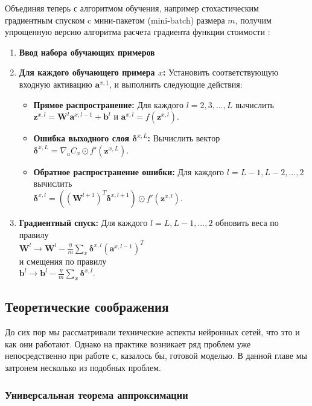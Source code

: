 Объединяя теперь с алгоритмом обучения, например стохастическим градиентным 
спуском c мини-пакетом (mini-batch) размера $m$, получим упрощенную версию 
алгоритма расчета градиента функции стоимости \cite{NN_Nielsen}:
\begin{enumerate}
    \item \textbf{Ввод набора обучающих примеров}
    \item \textbf{Для каждого обучающего примера $x$:} Установить соответствующую входную активацию $\bm{a}^{x,1}$, и выполнить следующие действия:
    \begin{itemize}
        \item \textbf{Прямое распространение:} Для каждого $l=2,3,...,L$ вычислить \\$\bm{z}^{x,l}=\bm{W}^l \bm{a}^{x,l-1} + \bm{b}^l$ и $\bm{a}^{x,l} = f(\bm{z}^{x,l})$. 
        \item \textbf{Ошибка выходного слоя $\bm{\delta}^{x,L}$:} Вычислить вектор\\ $\bm{\delta}^{x,L}=\nabla_a C_x \odot f'(\bm{z}^{x,L})$.
        \item \textbf{Обратное распространение ошибки:} Для каждого $l=L-1, L-2, ..., 2$ вычислить \\$\bm{\delta}^{x,l}=((\bm{W}^{l+1})^T \bm{\delta}^{x,l+1}) \odot f'(\bm{z}^{x,l})$.
    \end{itemize}
    \item \textbf{Градиентный спуск:} Для каждого $l=L,L-1,...,2$ обновить веса по правилу\\$\bm{W}^l \rightarrow \bm{W}^l - \frac{\eta}{m} \sum_x \bm{\delta}^{x,l} (\bm{a}^{x,l-1})^T$\\и смещения по правилу\\$\bm{b}^l \rightarrow \bm{b}^l - \frac{\eta}{m} \sum_x \bm{\delta}^{x,l}$.
\end{enumerate}

\subsection{Теоретические соображения}

До сих пор мы рассматривали технические аспекты нейронных сетей, что это и как они работают. 
Однако на практике возникает ряд проблем уже непосредственно при работе с, казалось бы, готовой моделью. 
В данной главе мы затронем несколько из подобных проблем.

\subsubsection{Универсальная теорема аппроксимации}

